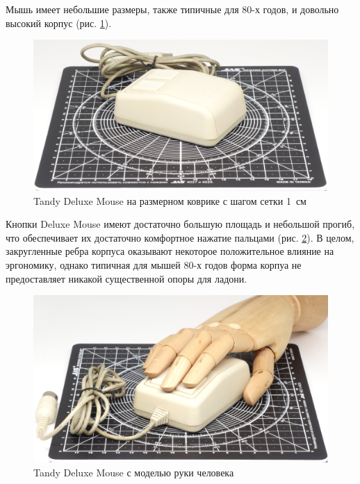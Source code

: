 \documentclass[11pt, a4paper]{article}
\begin{document}
Мышь имеет небольшие размеры, также типичные для 80-х годов, и довольно высокий корпус (рис. \ref{fig:TandyDeluxeMouseSize}).

\begin{figure}[h]
    \centering
    \includegraphics[scale=0.49]{1988_tandy_trs80_deluxe_mouse/size_15.jpg}
    \caption{Tandy Deluxe Mouse на размерном коврике с шагом сетки 1~см}
    \label{fig:TandyDeluxeMouseSize}
\end{figure}

Кнопки Deluxe Mouse имеют достаточно большую площадь и небольшой прогиб, что обеспечивает их достаточно комфортное нажатие пальцами (рис. \ref{fig:TandyDeluxeMouseHand}). В целом, закругленные ребра корпуса оказывают некоторое положительное влияние на эргономику, однако типичная для мышей 80-х годов форма корпуа не предоставляет никакой существенной опоры для ладони.

\begin{figure}[h]
    \centering
    \includegraphics[scale=0.55]{1988_tandy_trs80_deluxe_mouse/hand_15.jpg}
    \caption{Tandy Deluxe Mouse с моделью руки человека}
    \label{fig:TandyDeluxeMouseHand}
\end{figure}
\end{document}
